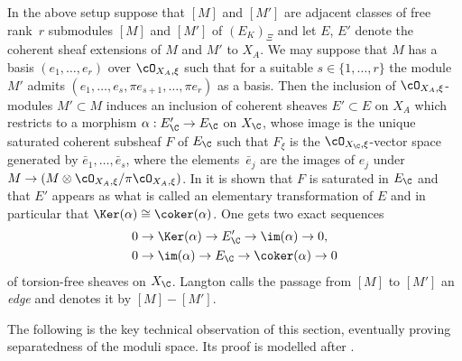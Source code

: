 \begin{rem}\label{rem:adjacent classes}
In the above setup suppose that $[M]$ and $[M']$ are adjacent classes of free rank~$r$ submodules $[M]$ and $[M']$ of $(E_K)_\Xi$ and let $E$, $E'$ denote the coherent sheaf extensions of $M$ and $M'$ to $X_A$. We may suppose that $M$ has a basis $(e_1,\dots,e_r)$ over $\cO_{X_A,\xi}$ such that for a suitable $s\in\{1,\dots,r\}$ the module $M'$ admits $(e_1,\dots, e_s,\pi e_{s+1},\dots,\pi e_r)$ as a basis.
Then the inclusion of $\cO_{X_A,\xi}$-modules $M'\subset M$ induces an inclusion of coherent sheaves $E'\subset E$ on $X_A$ which restricts to a morphism $\alpha: E'_\C\to E_\C$ on $X_\C$, whose image is the unique saturated coherent subsheaf $F$ of $E_\C$ such that $F_\xi$ is the $\cO_{X_\C,\xi}$-vector space generated by $\bar e_1,\dots,\bar e_s$, where the elements~$\bar e_j$ are the images of $e_j$ under $M\to (M\otimes \cO_{X_A,\xi}/\pi \cO_{X_A,\xi})$.
In \cite[Prop.\,7]{Langton} it is shown that $F$ is saturated in $E_\C$ and that $E'$ appears as what is called an elementary transformation of $E$ and in particular that $\Ker(\alpha)\cong \coker(\alpha)$.
One gets two exact sequences
\begin{align}
0&\to \Ker(\alpha)\to E'_\C\to \im(\alpha)\to0, \label{eq:sequence1}\\
0&\to\im(\alpha)\to E_\C\to\coker(\alpha)\to0\label{eq:sequence2}
\end{align}
of torsion-free sheaves on $X_\C$.
Langton calls the passage from $[M]$ to $[M']$ an {\it edge} and denotes it by $[M] -[M']$.
\end{rem}

The following is the key technical observation of this section, eventually proving separatedness of the moduli space. Its proof is modelled after \cite[p.\,101--102]{Langton}.

